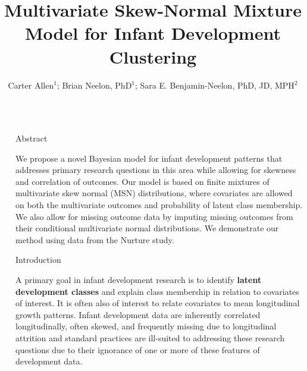 \documentclass[final]{beamer}
\title{Multivariate Skew-Normal Mixture Model for Infant Development Clustering} %
\author{Carter Allen$^1$; Brian Neelon, PhD$^1$; Sara E. Benjamin-Neelon, PhD, JD, MPH$^2$} %
\institute{$^1$Department of Public Health Sciences, Medical University of South Carolina; $^2$Bloomberg School of Public Health, Johns Hopkins University}
\newlength{\sepwid}
\newlength{\onecolwid}
\begin{document}

\setlength{\belowcaptionskip}{2ex} %
\setlength\belowdisplayshortskip{2ex} %

\begin{frame}[t] %

\begin{columns}[t] %

\begin{column}{\sepwid}\end{column} %

\begin{column}{\onecolwid} %


\begin{alertblock}{Abstract}
 
We propose a novel Bayesian model for infant development patterns that addresses primary research questions in this area while allowing for skewness and correlation of outcomes. Our model is based on finite mixtures of multivariate skew normal (MSN) distributions, where covariates are allowed on both the multivariate outcomes and probability of latent class membership. We also allow for missing outcome data by imputing missing outcomes from their conditional multivariate normal distributions. We demonstrate our method using data from the Nurture study.

\end{alertblock}


\begin{block}{Introduction}

A primary goal in infant development research is to identify \textbf{latent development classes} and explain class membership in relation to covariates of interest. It is often also of interest to relate covariates to mean longitudinal growth patterns. Infant development data are inherently correlated longitudinally, often skewed, and frequently missing due to longitudinal attrition and standard practices are ill-suited to addressing these research questions due to their ignorance of one or more of these features of development data. 


\end{block}
\end{column}
\end{columns}
\end{frame}
\end{document}
